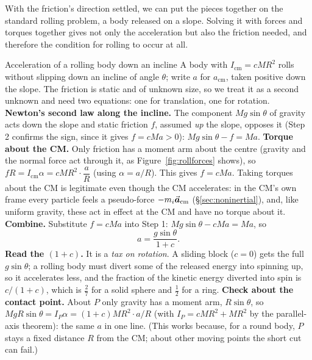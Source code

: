 With the friction's direction settled, we can put the pieces together on the standard rolling problem, a
body released on a slope. Solving it with forces and torques together gives
not only the acceleration but also the friction needed, and therefore the condition for rolling to occur at all.

\begin{derivbox}{Acceleration of a rolling body down an incline}
A body with $I_{\text{cm}}=cMR^2$ rolls without slipping down an incline of angle $\theta$; write $a$ for
$a_{\text{cm}}$, taken positive down the slope. The friction is static and of unknown size, so we treat it
as a second unknown and need two equations: one for translation, one for rotation.
 \textbf{Newton's second law along the incline.} The component $Mg\sin\theta$ of gravity acts down the slope and static friction $f$, assumed
\emph{up} the slope, opposes it (Step 2 confirms the sign, since it gives $f=cMa>0$):
$Mg\sin\theta-f=Ma$.
 \textbf{Torque about the CM.} Only friction has a moment arm about the centre (gravity and the
normal force act through it, as Figure~\ref{fig:rollforces} shows), so $fR=I_{\text{cm}}\alpha=cMR^2\cdot\dfrac{a}{R}$ (using $\alpha=a/R$).
This gives $f=cMa$. Taking torques about the CM is legitimate even though the CM accelerates: in the CM's
own frame every particle feels a pseudo-force $-m_i\vec{\bm{a}}_{\text{cm}}$ (\S\ref{sec:noninertial}), and,
like uniform gravity, these act in effect at the CM and have no torque about it.
 \textbf{Combine.} Substitute $f=cMa$ into Step 1:
$Mg\sin\theta-cMa=Ma$, so
\[
\boxed{a=\frac{g\sin\theta}{1+c}.}
\]
 \textbf{Read the $(1+c)$.} It is a \emph{tax on rotation}. A sliding block ($c=0$) gets the full
$g\sin\theta$; a rolling body must divert some of the released energy into spinning up, so it accelerates less, and
the fraction of the kinetic energy diverted into spin is $c/(1+c)$, which is $\tfrac27$ for a solid
sphere and $\tfrac12$ for a ring.
 \textbf{Check about the contact point.} About $P$ only gravity has a moment arm, $R\sin\theta$,
so $MgR\sin\theta=I_P\alpha=(1+c)MR^2\cdot a/R$ (with $I_P=cMR^2+MR^2$ by the parallel-axis theorem):
the same $a$ in one line. (This works because, for a round
body, $P$ stays a fixed distance $R$ from the CM; about other moving points the short cut can fail.)
\end{derivbox}

\begin{figure}[htbp]
\centering
{}
\end{figure}

